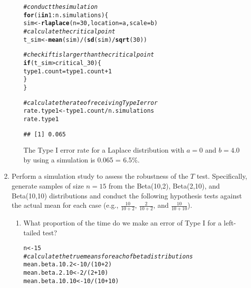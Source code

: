 \documentclass{article}\usepackage[]{graphicx}\usepackage[]{xcolor}
\makeatletter
\newcommand{\hlnum}[1]{\textcolor[rgb]{0.686,0.059,0.569}{#1}}%
\newcommand{\hlcom}[1]{\textcolor[rgb]{0.678,0.584,0.686}{\textit{#1}}}%
\newcommand{\hlopt}[1]{\textcolor[rgb]{0,0,0}{#1}}%
\newcommand{\hldef}[1]{\textcolor[rgb]{0.345,0.345,0.345}{#1}}%
\newcommand{\hlkwa}[1]{\textcolor[rgb]{0.161,0.373,0.58}{\textbf{#1}}}%
\newcommand{\hlkwb}[1]{\textcolor[rgb]{0.69,0.353,0.396}{#1}}%
\newcommand{\hlkwc}[1]{\textcolor[rgb]{0.333,0.667,0.333}{#1}}%
\newcommand{\hlkwd}[1]{\textcolor[rgb]{0.737,0.353,0.396}{\textbf{#1}}}%
\newenvironment{kframe}{%
 \def\at@end@of@kframe{}%
 \ifinner\ifhmode%
  \def\at@end@of@kframe{\end{minipage}}%
  \begin{minipage}{\columnwidth}%
 \fi\fi%
 \def\FrameCommand##1{\hskip\@totalleftmargin \hskip-\fboxsep
 \colorbox{shadecolor}{##1}\hskip-\fboxsep
     \hskip-\linewidth \hskip-\@totalleftmargin \hskip\columnwidth}%
 \MakeFramed {\advance\hsize-\width
   \@totalleftmargin\z@ \linewidth\hsize
   \@setminipage}}%
 {\par\unskip\endMakeFramed%
 \at@end@of@kframe}
\newenvironment{knitrout}{}{} %
\makeatother
\begin{document}
\begin{enumerate}
\begin{enumerate}
\begin{knitrout}
\begin{kframe}
\begin{alltt}
\hlcom{#conduct the simulation}
\hlkwa{for} \hldef{(i} \hlkwa{in} \hlnum{1}\hlopt{:}\hldef{n.simulations)\{}
\hldef{sim} \hlkwb{<-} \hlkwd{rlaplace}\hldef{(}\hlkwc{n} \hldef{=} \hlnum{30}\hldef{,} \hlkwc{location} \hldef{= a,} \hlkwc{scale} \hldef{= b)}
\hlcom{#calculate the critical point}
\hldef{t_sim} \hlkwb{<-} \hlkwd{mean}\hldef{(sim)}\hlopt{/} \hldef{(}\hlkwd{sd}\hldef{(sim)}\hlopt{/}\hlkwd{sqrt}\hldef{(}\hlnum{30}\hldef{))}

\hlcom{#check if t is larger than the critical point}
\hlkwa{if} \hldef{(t_sim} \hlopt{>} \hldef{critical_30)\{}
  \hldef{type1.count} \hlkwb{=} \hldef{type1.count} \hlopt{+} \hlnum{1}
\hldef{\}}
\hldef{\}}

\hlcom{#calculate the rate of receiving Type I error }
\hldef{rate.type1} \hlkwb{<-} \hldef{type1.count}\hlopt{/}\hldef{n.simulations}
\hldef{rate.type1}
\end{alltt}
\begin{verbatim}
## [1] 0.065
\end{verbatim}
\end{kframe}
\end{knitrout}
The Type I error rate for a Laplace distribution with $a=0$ and $b=4.0$ by using a simulation is 0.065 = 6.5\%. 
\end{enumerate}
  \item Perform a simulation study to assess the robustness of the $T$ test. 
  Specifically, generate samples of size $n=15$ from the Beta(10,2), Beta(2,10), 
  and Beta(10,10) distributions and conduct the following hypothesis tests against 
  the actual mean for each case (e.g., $\frac{10}{10+2}$, $\frac{2}{10+2}$, and 
  $\frac{10}{10+10}$). 
  \begin{enumerate}
    \item What proportion of the time do we make an error of Type I for a
    left-tailed test?
\begin{knitrout}\scriptsize
{}\color{fgcolor}\begin{kframe}
\begin{alltt}
\hldef{n} \hlkwb{<-}\hlnum{15}
\hlcom{#calculate the true means for each of beta distributions}
\hldef{mean.beta.10.2} \hlkwb{<-} \hlnum{10}\hlopt{/}\hldef{(}\hlnum{10}\hlopt{+}\hlnum{2}\hldef{)}
\hldef{mean.beta.2.10} \hlkwb{<-} \hlnum{2}\hlopt{/}\hldef{(}\hlnum{2}\hlopt{+}\hlnum{10}\hldef{)}
\hldef{mean.beta.10.10} \hlkwb{<-} \hlnum{10}\hlopt{/}\hldef{(}\hlnum{10}\hlopt{+}\hlnum{10}\hldef{)}


\end{alltt}
\end{kframe}
\end{knitrout}
\end{enumerate}
\end{enumerate}
\end{document}

